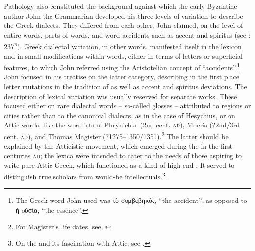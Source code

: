 Pathology also constituted the background against which the early Byzantine author John the Grammarian developed his three levels of variation to describe the Greek dialects. They differed from each other, John claimed, on the level of entire words, parts of words, and word accidents such as accent and spiritus (see \citealt{Manutius1496Thesaurus}: 237\textsc{\textsuperscript{r}}). Greek dialectal variation, in other words, manifested itself in the lexicon and in small modifications within words, either in terms of letters or superficial features, to which John referred using the Aristotelian concept of “accidents”.\footnote{The Greek word John used was τὸ συμβεβηκός, “the accident”, as opposed to ἡ oὐσία, “the essence”.} John focused in his treatise on the latter category, describing in the first place letter mutations in the tradition of  as well as accent and spiritus deviations. The description of lexical variation was usually reserved for separate works. These focused either on rare dialectal words – so-called glosses – attributed to regions or cities rather than to the canonical dialects, as in the case of Hesychius, or on Attic words, like the wordlists of Phrynichus (2nd cent. \textsc{ad}), Moeris (?2nd/3rd cent. \textsc{ad}), and Thomas Magister (?1275–1350/1351).\footnote{{For Magister’s life dates, see \citet[417]{Baloglou1998}.}} The latter should be explained by the Atticistic movement, which emerged during the  in the first centuries \textsc{ad}; the lexica were intended to cater to the needs of those aspiring to write pure Attic Greek, which functioned as a kind of high-end . It served to distinguish true scholars from would-be intellectuals.\footnote{On the  and its fascination with Attic, see \citet{Whitmarsh2005}.}



